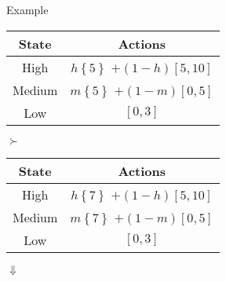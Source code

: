 \documentclass[usenames,dvipsnames,aspectratio=169,11pt, envcountsect, handout]{beamer}
\begin{document}
\begin{frame}[noframenumbering]{Example}
	\begin{table}[H]
		\centering
		\begin{minipage}{0.45\textwidth}
			\centering
			\begin{tabular}{c | c}
				State                          & Actions                                                                                       \\
				\hline
				{\color{bleudefrance} High}    & {\color{bleudefrance}\( h \left\{ 5 \right\} \) } \(+ \left(1-h \right) \left[5,10 \right] \) \\
				{\color{bleudefrance} Medium } & {\color{bleudefrance}\( m \left\{ 5 \right\} \) } \(+ \left(1-m \right) \left[0,5 \right] \)  \\
				Low                            & \( \left[0,3 \right] \)                                                                       \\
			\end{tabular}
		\end{minipage}\hspace{0.25cm} %
		\( \succ \) %
		\hspace{0.25cm}
		\begin{minipage}{0.45\textwidth}
			\centering
			\begin{tabular}{c | c}
				State                          & Actions                                                                                       \\
				\hline
				{\color{bleudefrance} High}    & {\color{bleudefrance}\( h \left\{ 7 \right\} \) } \(+ \left(1-h \right) \left[5,10 \right] \) \\
				{\color{bleudefrance} Medium } & {\color{bleudefrance}\( m \left\{ 7 \right\} \) } \(+ \left(1-m \right) \left[0,5 \right] \)  \\
				Low                            & \( \left[0,3 \right] \)                                                                       \\
			\end{tabular}
		\end{minipage}
	\end{table} \pause

	\begin{center}
		\( \Downarrow \)
	\end{center}


\end{frame}
\end{document}
